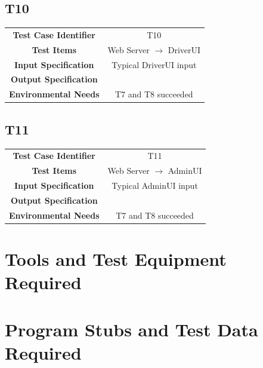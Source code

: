 \documentclass{article}
\begin{document}
\subsection{T10}
\begin{adjustbox}{width=1.2\textwidth}	
	\begin{tabular}{*{2}{c}}
		\midrule
		\textbf{Test Case Identifier} & T10\\
		\textbf{Test Items} & Web Server $\rightarrow$ DriverUI\\
		\textbf{Input Specification} & Typical DriverUI input\\
		\textbf{Output Specification} & \\ %
		\textbf{Environmental Needs} & T7 and T8 succeeded\\
		\bottomrule
	\end{tabular}
\end{adjustbox}
\subsection{T11}
\begin{adjustbox}{width=1.2\textwidth}	
	\begin{tabular}{*{2}{c}}
		\midrule
		\textbf{Test Case Identifier} & T11\\
		\textbf{Test Items} & Web Server $\rightarrow$ AdminUI\\
		\textbf{Input Specification} & Typical AdminUI input\\
		\textbf{Output Specification} & \\ %
		\textbf{Environmental Needs} & T7 and T8 succeeded\\
		\bottomrule
	\end{tabular}
\end{adjustbox}
\section{Tools and Test Equipment Required}
\section{Program Stubs and Test Data Required}
\end{document}
